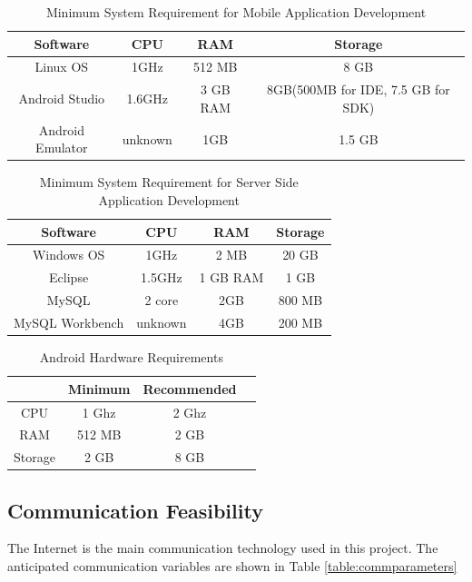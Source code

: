 \begin{table}[!ht]
\centering
\caption{Minimum System Requirement for Mobile Application Development}
\label{minreq}
\begin{tabular}{|c|c|c|c|}
\hline
\textbf{Software}& \textbf{CPU} & \textbf{RAM}  & \textbf{Storage} \\ \hline
Linux OS\cite{linuxMinimumSystemRequirements} & 1GHz & 512 MB & 8 GB \\ \hline
Android Studio\cite{androidMinimumSystemRequirements} & 1.6GHz & 3 GB RAM  & 8GB(500MB for IDE, 7.5 GB for SDK) \\ \hline
Android Emulator\cite{androidMinimumSystemRequirements} & unknown & 1GB & 1.5 GB \\ \hline
\end{tabular}
\end{table}

\begin{table}[!ht]
\centering
\caption{Minimum System Requirement for Server Side Application Development}
\label{minreq}
\begin{tabular}{|c|c|c|c|}
\hline
\textbf{Software}& \textbf{CPU} & \textbf{RAM}  & \textbf{Storage} \\ \hline
Windows OS\cite{microsoft} & 1GHz & 2 MB & 20 GB \\ \hline
Eclipse\cite{androidMinimumSystemRequirements} & 1.5GHz & 1 GB RAM  & 1 GB  \\ \hline
MySQL\cite{mysql} & 2 core & 2GB & 800 MB \\ \hline
MySQL Workbench\cite{mysql} & unknown & 4GB & 200 MB \\ \hline
\end{tabular}
\end{table}

\begin{table}[!ht]
\centering
\caption{Android Hardware Requirements}
\label{androidhardware}
\begin{tabular}{|c|c|c|c|}
\hline
            & \textbf{Minimum}    & \textbf{Recommended} \\\hline
CPU & 1 Ghz      & 2 Ghz     \\\hline
RAM       & 512 MB       & 2 GB        \\\hline
Storage   & 2 GB       & 8 GB       \\\hline
\end{tabular}
\end{table}

\subsection{Communication Feasibility}
The Internet is the main communication technology used in this project. The
anticipated communication variables are shown in Table \ref{table:commparameters}

